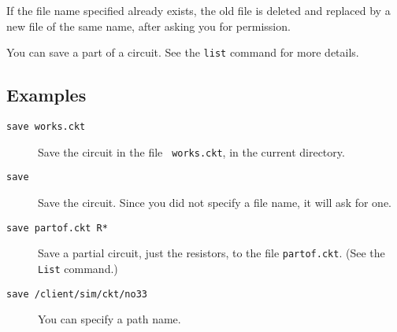 If the file name specified already exists, the old file is deleted and
replaced by a new file of the same name, after asking you for permission.

You can save a part of a circuit.  See the {\tt list} command for more details.
\subsection{Examples}

\begin{description}

\item[{\tt save works.ckt}] Save the circuit in the file {\tt
works.ckt}, in the current directory.

\item[{\tt save}] Save the circuit.  Since you did not specify a file name,
it will ask for one.

\item[{\tt save partof.ckt R*}] Save a partial circuit, just the
resistors, to the file {\tt partof.ckt}.  (See the {\tt List}
command.)


\item[{\tt save /client/sim/ckt/no33}] You can specify a path name.

\end{description}
